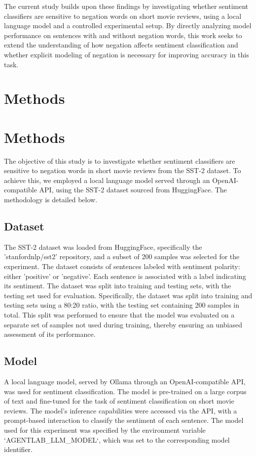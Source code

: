 \documentclass{article}
\begin{document}
The current study builds upon these findings by investigating whether sentiment classifiers are sensitive to negation words on short movie reviews, using a local language model and a controlled experimental setup. By directly analyzing model performance on sentences with and without negation words, this work seeks to extend the understanding of how negation affects sentiment classification and whether explicit modeling of negation is necessary for improving accuracy in this task.
\section{Methods}
\section{Methods}

The objective of this study is to investigate whether sentiment classifiers are sensitive to negation words in short movie reviews from the SST-2 dataset. To achieve this, we employed a local language model served through an OpenAI-compatible API, using the SST-2 dataset sourced from HuggingFace. The methodology is detailed below.

\subsection{Dataset}

The SST-2 dataset was loaded from HuggingFace, specifically the 'stanfordnlp/sst2' repository, and a subset of 200 samples was selected for the experiment. The dataset consists of sentences labeled with sentiment polarity: either 'positive' or 'negative'. Each sentence is associated with a label indicating its sentiment. The dataset was split into training and testing sets, with the testing set used for evaluation. Specifically, the dataset was split into training and testing sets using a 80:20 ratio, with the testing set containing 200 samples in total. This split was performed to ensure that the model was evaluated on a separate set of samples not used during training, thereby ensuring an unbiased assessment of its performance.

\subsection{Model}

A local language model, served by Ollama through an OpenAI-compatible API, was used for sentiment classification. The model is pre-trained on a large corpus of text and fine-tuned for the task of sentiment classification on short movie reviews. The model's inference capabilities were accessed via the API, with a prompt-based interaction to classify the sentiment of each sentence. The model used for this experiment was specified by the environment variable `AGENTLAB_LLM_MODEL`, which was set to the corresponding model identifier.
\end{document}

